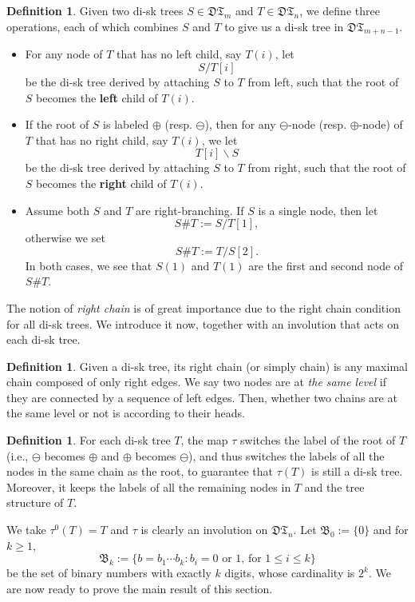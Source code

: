 \documentclass[11pt,reqno]{amsart}
\numberwithin{equation}{section}
\theoremstyle{plain}
\theoremstyle{definition}
\newtheorem{Def}[theorem]{Definition}
\newcommand{\I}{\mathfrak{B}}
\def\DT{\mathfrak{DT}}
\begin{document}
\begin{Def}
Given two di-sk trees $S\in\mathfrak{DT}_m$ and $T\in\mathfrak{DT}_n$, we define three operations, each of which combines $S$ and $T$ to give us a di-sk tree in $\mathfrak{DT}_{m+n-1}$.
\begin{itemize}
	\item For any node of $T$ that has no left child, say $T(i)$, let $$S\slash T[i]$$ be the di-sk tree derived by attaching $S$ to $T$ from left, such that the root of $S$ becomes the {\bf left} child of $T(i)$.
	\item If the root of $S$ is labeled $\oplus$ (resp. $\ominus$), then for any $\ominus$-node (resp. $\oplus$-node) of $T$ that has no right child, say $T(i)$, we let $$T[i]\backslash S $$ be the di-sk tree derived by attaching $S$ to $T$ from right, such that the root of $S$ becomes the {\bf right} child of $T(i)$.
	\item Assume both $S$ and $T$ are right-branching. If $S$ is a single node, then let $$S\#T:=S\slash T[1],$$ otherwise we set $$S\#T:=T\slash S[2].$$ In both cases, we see that $S(1)$ and $T(1)$ are the first and second node of $S\#T$.
\end{itemize}
\end{Def}
The notion of \emph{right chain} is of great importance due to the right chain condition for all di-sk trees. We introduce it now, together with an involution that acts on each di-sk tree.
\begin{Def}
Given a di-sk tree, its right chain (or simply chain) is any maximal chain composed of only right edges. We say two nodes are at \emph{the same level} if they are connected by a sequence of left edges. Then, whether two chains are at the same level or not is according to their heads.
\end{Def}
\begin{Def}
For each di-sk tree $T$, the map $\tau$ switches the label of the root of $T$ (i.e., $\ominus$ becomes $\oplus$ and $\oplus$ becomes $\ominus$), and thus switches the labels of all the nodes in the same chain as the root, to guarantee that $\tau(T)$ is still a di-sk tree. Moreover, it keeps the labels of all the remaining nodes in $T$ and the tree structure of $T$.
\end{Def}

We take $\tau^0(T)=T$ and $\tau$ is clearly an involution on $\DT_n$. Let $\I_0:=\{0\}$ and for $k\ge 1$,
$$\I_k:=\{b=b_1\cdots b_k: \text{$b_i=0$ or $1$, for $1\le i\le k$}\}$$
be the set of binary numbers with exactly $k$ digits, whose cardinality is $2^k$. We are now ready to prove the main result of this section.
\end{document}
